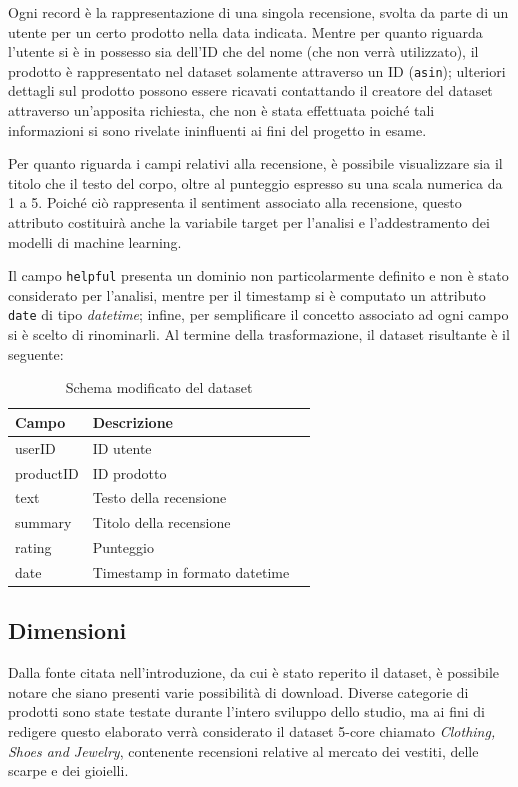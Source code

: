 \documentclass[hidelinks, 12pt]{article}
\begin{document}
Ogni record è la rappresentazione di una singola recensione, svolta da parte di un utente per un certo prodotto nella data indicata. Mentre per quanto riguarda l'utente si è in possesso sia dell'ID che del nome (che non verrà utilizzato), il prodotto è rappresentato nel dataset solamente attraverso un ID (\texttt{asin}); ulteriori dettagli sul prodotto possono essere ricavati contattando il creatore del dataset attraverso un'apposita richiesta, che non è stata effettuata poiché tali informazioni si sono rivelate ininfluenti ai fini del progetto in esame.

Per quanto riguarda i campi relativi alla recensione, è possibile visualizzare sia il titolo che il testo del corpo, oltre al punteggio espresso su una scala numerica da 1 a 5. Poiché ciò rappresenta il sentiment associato alla recensione, questo attributo costituirà anche la variabile target per l'analisi e l'addestramento dei modelli di machine learning.

Il campo \texttt{helpful} presenta un dominio non particolarmente definito e non è stato considerato per l'analisi, mentre per il timestamp si è computato un attributo \texttt{date} di tipo \textit{datetime}; infine, per semplificare il concetto associato ad ogni campo si è scelto di rinominarli. Al termine della trasformazione, il dataset risultante è il seguente:

\begin{table}[H]
	\caption{Schema modificato del dataset}\label{tab:df-schema-new}
	\centering
	\begin{tabular}{|l|l|l|}
		\hline
		Campo & Descrizione \\
		\hline
		userID & ID utente \\
		productID & ID prodotto \\
		text & Testo della recensione \\
		summary & Titolo della recensione \\
		rating & Punteggio \\
		date & Timestamp in formato datetime \\
		\hline
	\end{tabular}
\end{table}



\subsection{Dimensioni}
\label{sec:dimensions}

Dalla fonte citata nell'introduzione, da cui è stato reperito il dataset, è possibile notare che siano presenti varie possibilità di download. Diverse categorie di prodotti sono state testate durante l'intero sviluppo dello studio, ma ai fini di redigere questo elaborato verrà considerato il dataset 5-core chiamato \textit{Clothing, Shoes and Jewelry}, contenente recensioni relative al mercato dei vestiti, delle scarpe e dei gioielli.
\end{document}
